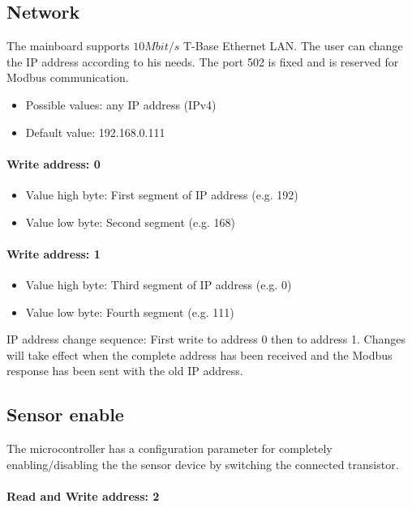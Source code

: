 \subsection{Network}
The mainboard supports $10 Mbit/s$ T-Base Ethernet LAN. The user can change the IP address according to his needs. The port 502 is fixed and is reserved for Modbus communication.

\begin{itemize}
    \item Possible values: any IP address (IPv4)
    \item Default value: 192.168.0.111
\end{itemize}

\paragraph{Write address: 0} 
\begin{itemize}
    \item Value high byte: First segment of IP address (e.g. 192)
    \item Value low byte: Second segment (e.g. 168)
\end{itemize}

\paragraph{Write address: 1} 
\begin{itemize}
    \item Value high byte: Third segment of IP address (e.g. 0)
    \item  Value low byte: Fourth segment (e.g. 111)
\end{itemize}

IP address change sequence: First write to address 0 then to address 1. Changes will take effect when the complete address has been received and the Modbus response has been sent with the old IP address.

\subsection{Sensor enable}
\label{sec:sensor_enable}
The microcontroller has a configuration parameter for completely enabling/disabling the the sensor device by switching the connected transistor. 

\paragraph{Read and Write address: 2}
